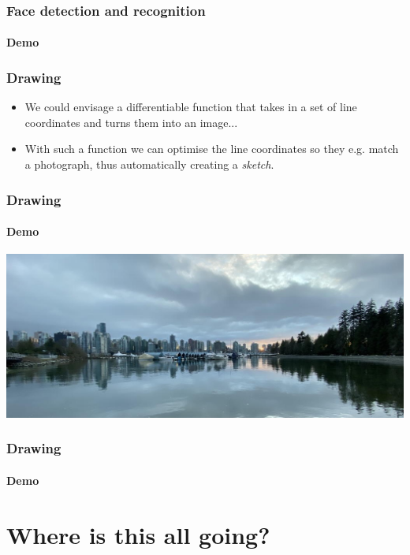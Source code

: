 \documentclass[\beamerclass]{beamer}
\begin{document}
\begin{frame}
\frametitle{Face detection and recognition}
\framesubtitle{Demo}
\end{frame}


\begin{frame}
\frametitle{Drawing}

\begin{itemize}
	\item We could envisage a differentiable function that takes in a set of line coordinates and turns them into an image...
	\item With such a function we can optimise the line coordinates so they e.g. match a photograph, thus automatically creating a \emph{sketch}.
\end{itemize}
\end{frame}

\begin{frame}
\frametitle{Drawing}
\framesubtitle{Demo}

\center
\includegraphics[width=\textwidth]{vancouver.jpg}

\end{frame}

\begin{frame}
\frametitle{Drawing}
\framesubtitle{Demo}

\end{frame}

\section{Where is this all going?}
\end{document}
